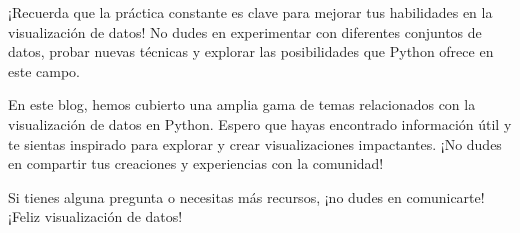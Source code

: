 \documentclass[
  a4paper,
]{article}
\begin{document}
¡Recuerda que la práctica constante es clave para mejorar tus
habilidades en la visualización de datos! No dudes en experimentar con
diferentes conjuntos de datos, probar nuevas técnicas y explorar las
posibilidades que Python ofrece en este campo.

En este blog, hemos cubierto una amplia gama de temas relacionados con
la visualización de datos en Python. Espero que hayas encontrado
información útil y te sientas inspirado para explorar y crear
visualizaciones impactantes. ¡No dudes en compartir tus creaciones y
experiencias con la comunidad!

Si tienes alguna pregunta o necesitas más recursos, ¡no dudes en
comunicarte! ¡Feliz visualización de datos!


\printbibliography
\end{document}
